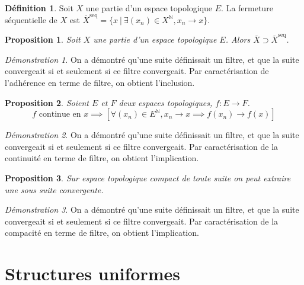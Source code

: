 \documentclass[a4paper, 11pt, french]{book}
\theoremstyle{plain} %
\newtheorem{proposition}{Proposition}
\theoremstyle{definition} %
\newtheorem{definition}{Définition}
\theoremstyle{remark} %
\newtheorem*{demonstration}{Démonstration}
\newcommand{\1}{\mathds{1}}
\newcommand{\N}{\mathbb{N}}
\newcommand\ens[2]{\{#1 \ |\ #2\}}
\begin{document}
\begin{definition}
	Soit $X$ une partie d'un espace topologique $E$.
	La fermeture séquentielle de $X$ est $\overline{X}^\text{seq}=\ens{x}{\exists(x_n)\in X^\N, x_n\rightarrow x}$.
\end{definition}

\begin{proposition}
	Soit $X$ une partie d'un espace topologique $E$.
	Alors $\overline{X}\supset\overline{X}^\text{seq}$.
\end{proposition}

\begin{demonstration}
	On a démontré qu'une suite définissait un filtre, et que la suite convergeait si et seulement si ce filtre convergeait.
	Par caractérisation de l'adhérence en terme de filtre, on obtient l'inclusion.
\end{demonstration}

\begin{proposition}
	Soient $E$ et $F$ deux espaces topologiques, $f:E\rightarrow F$.
	$$
		\text{$f$ continue en $x$}
		\implies
		\left[\forall(x_n)\in E^\N, x_n\rightarrow x\implies f(x_n)\rightarrow f(x)\right]
	$$
\end{proposition}

\begin{demonstration}
	On a démontré qu'une suite définissait un filtre, et que la suite convergeait si et seulement si ce filtre convergeait.
	Par caractérisation de la continuité en terme de filtre, on obtient l'implication.
\end{demonstration}

\begin{proposition}
	Sur espace topologique compact de toute suite on peut extraire une sous suite convergente.
\end{proposition}

\begin{demonstration}
	On a démontré qu'une suite définissait un filtre, et que la suite convergeait si et seulement si ce filtre convergeait.
	Par caractérisation de la compacité en terme de filtre, on obtient l'implication.
\end{demonstration}

\chapter{Structures uniformes}
\end{document}
